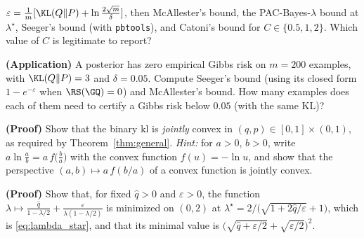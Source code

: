\begin{exercises}
\begin{exercise}
$\varepsilon=\frac1m[\KL(Q\|P)+\ln\frac{2\sqrt m}{\delta}]$, then McAllester's bound, the
PAC-Bayes-$\lambda$ bound at $\lambda^\star$, Seeger's bound (with \texttt{pbtools}), and
Catoni's bound for $C\in\{0.5,1,2\}$. Which value of $C$ is legitimate to report?
\end{exercise}
\begin{exercise}
\textbf{(Application)} A posterior has zero empirical Gibbs risk on $m=200$ examples,
with $\KL(Q\|P)=3$ and $\delta=0.05$. Compute Seeger's bound (using its closed form
$1-e^{-\varepsilon}$ when $\RS(\GQ)=0$) and McAllester's bound. How many examples does
each of them need to certify a Gibbs risk below $0.05$ (with the same KL)?
\end{exercise}
\begin{exercise}
\textbf{(Proof)} Show that the binary kl is \emph{jointly} convex in $(q,p)\in[0,1]\times(0,1)$,
as required by Theorem~\ref{thm:general}. \emph{Hint:} for $a>0$, $b>0$, write
$a\ln\frac ab=a\,f\big(\frac ba\big)$ with the convex function $f(u)=-\ln u$, and show that
the perspective $(a,b)\mapsto a\,f(b/a)$ of a convex function is jointly convex.
\end{exercise}
\begin{exercise}
\textbf{(Proof)} Show that, for fixed $\hat q>0$ and $\varepsilon>0$, the function
$\lambda\mapsto\frac{\hat q}{1-\lambda/2}+\frac{\varepsilon}{\lambda(1-\lambda/2)}$ is minimized on $(0,2)$
at $\lambda^\star=2/\big(\sqrt{1+2\hat q/\varepsilon}+1\big)$, which is \eqref{eq:lambda_star}, and that
its minimal value is $\big(\sqrt{\hat q+\varepsilon/2}+\sqrt{\varepsilon/2}\big)^2$.
\end{exercise}
\end{exercises}
